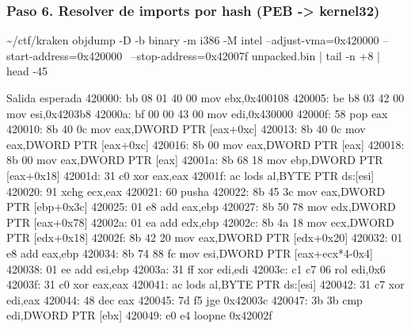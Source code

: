 \documentclass[11pt,a4paper]{article}
\begin{document}
\subsubsection*{Paso 6. Resolver de imports por hash (PEB -> kernel32)}\label{paso:kraken-06}
\begin{comando}{\textasciitilde{}/ctf/kraken}
objdump -D -b binary -m i386 -M intel --adjust-vma=0x420000 --start-address=0x420000 \
  --stop-address=0x42007f unpacked.bin | tail -n +8 | head -45
\end{comando}
\begin{salida}{Salida esperada}
  420000:       bb 08 01 40 00          mov    ebx,0x400108
  420005:       be b8 03 42 00          mov    esi,0x4203b8
  42000a:       bf 00 00 43 00          mov    edi,0x430000
  42000f:       58                      pop    eax
  420010:       8b 40 0c                mov    eax,DWORD PTR [eax+0xc]
  420013:       8b 40 0c                mov    eax,DWORD PTR [eax+0xc]
  420016:       8b 00                   mov    eax,DWORD PTR [eax]
  420018:       8b 00                   mov    eax,DWORD PTR [eax]
  42001a:       8b 68 18                mov    ebp,DWORD PTR [eax+0x18]
  42001d:       31 c0                   xor    eax,eax
  42001f:       ac                      lods   al,BYTE PTR ds:[esi]
  420020:       91                      xchg   ecx,eax
  420021:       60                      pusha
  420022:       8b 45 3c                mov    eax,DWORD PTR [ebp+0x3c]
  420025:       01 e8                   add    eax,ebp
  420027:       8b 50 78                mov    edx,DWORD PTR [eax+0x78]
  42002a:       01 ea                   add    edx,ebp
  42002c:       8b 4a 18                mov    ecx,DWORD PTR [edx+0x18]
  42002f:       8b 42 20                mov    eax,DWORD PTR [edx+0x20]
  420032:       01 e8                   add    eax,ebp
  420034:       8b 74 88 fc             mov    esi,DWORD PTR [eax+ecx*4-0x4]
  420038:       01 ee                   add    esi,ebp
  42003a:       31 ff                   xor    edi,edi
  42003c:       c1 c7 06                rol    edi,0x6
  42003f:       31 c0                   xor    eax,eax
  420041:       ac                      lods   al,BYTE PTR ds:[esi]
  420042:       31 c7                   xor    edi,eax
  420044:       48                      dec    eax
  420045:       7d f5                   jge    0x42003c
  420047:       3b 3b                   cmp    edi,DWORD PTR [ebx]
  420049:       e0 e4                   loopne 0x42002f

\end{salida}
\end{document}
